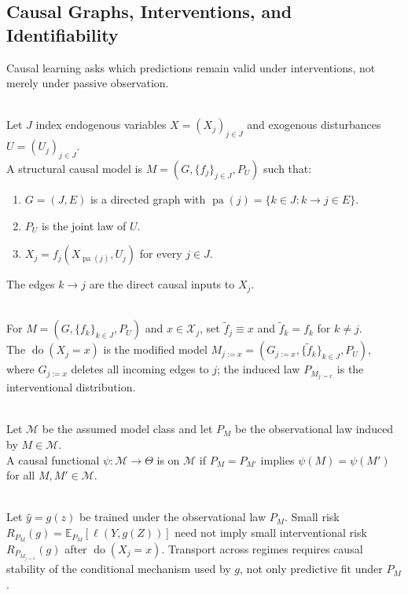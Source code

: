 \subsection{Causal Graphs, Interventions, and Identifiability}

Causal learning asks which predictions remain valid under interventions, not merely under passive observation.

\begin{definition} \label{def:sl-structural-causal-model} \\
Let $J$ index endogenous variables $X=(X_j)_{j\in J}$ and exogenous disturbances $U=(U_j)_{j\in J}$.\\
A structural causal model is $M=(G,\{f_j\}_{j\in J},P_U)$ such that:
\begin{enumerate}[label=(\roman*)]
\setlength{\itemsep}{0pt}
\item $G=(J,E)$ is a directed graph with $\operatorname{pa}(j)=\{k\in J:k\to j\in E\}$.
\item $P_U$ is the joint law of $U$.
\item $X_j=f_j(X_{\operatorname{pa}(j)},U_j)$ for every $j\in J$.
\end{enumerate}
The edges $k\to j$ are the direct causal inputs to $X_j$.
\end{definition}

\begin{definition} \label{def:sl-intervention-do-operator} \\
For $M=(G,\{f_k\}_{k\in J},P_U)$ and $x\in\mathcal X_j$, set $\tilde f_j\equiv x$ and $\tilde f_k=f_k$ for $k\ne j$.\\
The  $\operatorname{do}(X_j=x)$ is the modified model $M_{j:=x}=(G_{j:=x},\{\tilde f_k\}_{k\in J},P_U)$, where $G_{j:=x}$ deletes all incoming edges to $j$; the induced law $P_{M_{j:=x}}$ is the interventional distribution.
\end{definition}

\begin{definition} \label{def:sl-causal-identifiability} \\
Let $\mathcal M$ be the assumed model class and let $P_M$ be the observational law induced by $M\in\mathcal M$.\\
A causal functional $\psi:\mathcal M\to\Theta$ is  on $\mathcal M$ if $P_M=P_{M'}$ implies $\psi(M)=\psi(M')$ for all $M,M'\in\mathcal M$.
\end{definition}

\begin{remark} \label{rem:sl-causal-versus-predictive} \\
Let $\hat y=g(z)$ be trained under the observational law $P_M$. Small risk $R_{P_M}(g)=\mathbb E_{P_M}[\ell(Y,g(Z))]$ need not imply small interventional risk $R_{P_{M_{j:=x}}}(g)$ after $\operatorname{do}(X_j=x)$. Transport across regimes requires causal stability of the conditional mechanism used by $g$, not only predictive fit under $P_M$.
\end{remark}
